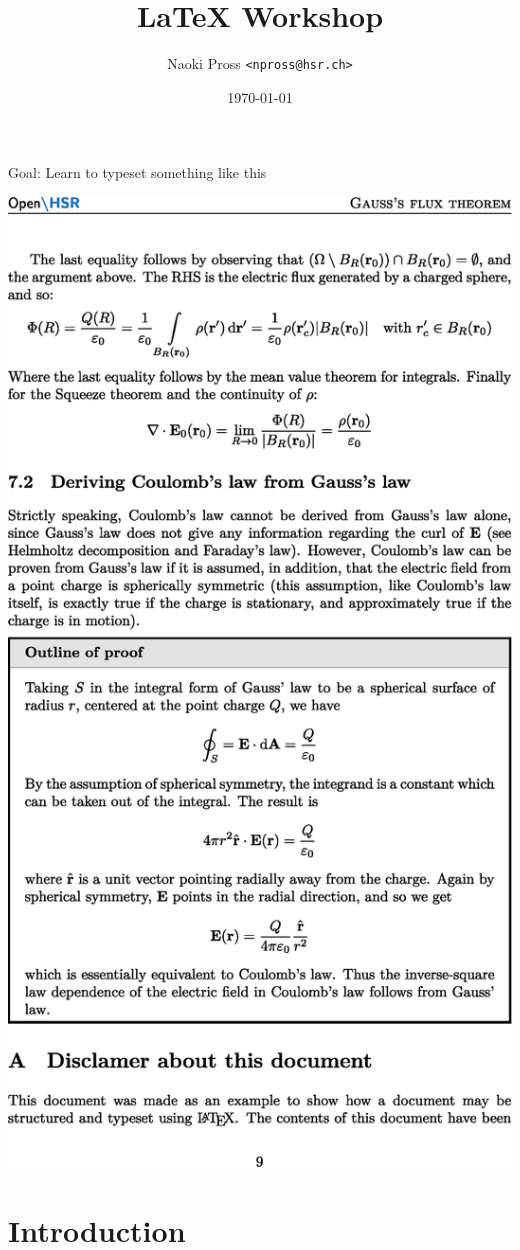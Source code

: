 \documentclass[xetex,serif, onlymath]{beamer}
\title{\textrm{\LaTeX} Workshop}
\author[NaoPross]{Naoki Pross \texttt{<npross@hsr.ch>}}
\date{\today}
\institute[HSR]{Hochschule f\"ur Technik Rapperswil}
\begin{document}
\begin{frame}
\maketitle
\end{frame}

\begin{frame}{Goal: Learn to typeset something like this}
	\begin{center}
		\vspace{1cm}
		\includegraphics[width=.8\linewidth]{figs/gauss-flux}
	\end{center}
\end{frame}

\section{Introduction}
\end{document}
